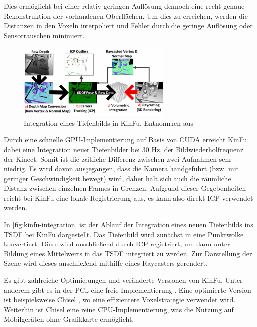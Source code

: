Dies ermöglicht bei einer relativ geringen Auflösung dennoch eine recht genaue Rekonstruktion der vorhandenen Oberflächen.
Um dies zu erreichen, werden die Distanzen in den Voxeln interpoliert und Fehler durch die geringe Auflösung oder Sensorrauschen minimiert.

\begin{figure}[ht]
	\centering
	\includegraphics[width=0.66\textwidth, frame]{images/kinfu-integration.png}
	\caption{Integration eines Tiefenbilds in \ac{KinFu}. Entnommen aus \cite{izadi2011kinectfusion}}
	\label{fig:kinfu-integration}
\end{figure}

Durch eine schnelle GPU-Implementierung auf Basis von \ac{CUDA} erreicht \ac{KinFu} dabei eine Integration neuer Tiefenbilder bei 30 Hz, der Bildwiederholfrequenz der Kinect.
Somit ist die zeitliche Differenz zwischen zwei Aufnahmen sehr niedrig.
Es wird davon ausgegangen, dass die Kamera handgeführt (bzw. mit geringer Geschwindigkeit bewegt) wird, daher hält sich auch die räumliche Distanz zwischen einzelnen Frames in Grenzen.
Aufgrund dieser Gegebenheiten reicht bei \ac{KinFu} eine lokale Registrierung aus, es kann also direkt \ac{ICP} verwendet werden.

In \autoref{fig:kinfu-integration} ist der Ablauf der Integration eines neuen Tiefenbilds ins \ac{TSDF} bei \ac{KinFu} dargestellt.
Das Tiefenbild wird zunächst in eine Punktwolke konvertiert.
Diese wird anschließend durch \ac{ICP} registriert, um dann unter Bildung eines Mittelwerts in das \ac{TSDF} integriert zu werden.
Zur Darstellung der Szene wird dieses anschließend mithilfe eines Raycasters gerendert.


Es gibt zahlreiche Optimierungen und veränderte Versionen von \ac{KinFu}.
Unter anderem gibt es in der \ac{PCL} eine freie Implementierung \cite{pirovano2012kinfu}.
Eine optimierte Version ist beispielsweise Chisel \cite{klingensmith2015chisel}, wo eine effizientere Voxelstrategie verwendet wird.
Weiterhin ist Chisel eine reine CPU-Implementierung, was die Nutzung auf Mobilgeräten ohne Grafikkarte ermöglicht.

